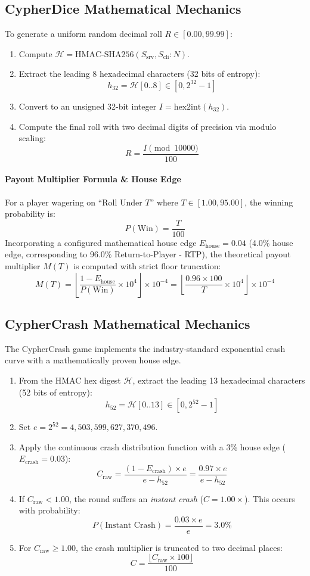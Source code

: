 \subsection{CypherDice Mathematical Mechanics}
To generate a uniform random decimal roll $R \in [0.00, 99.99]$:
\begin{enumerate}[leftmargin=1.5em]
    \item Compute $\mathcal{H} = \text{HMAC-SHA256}(S_{\text{srv}}, S_{\text{cli}} : N)$.
    \item Extract the leading 8 hexadecimal characters (32 bits of entropy):
    $$h_{32} = \mathcal{H}[0..8] \in [0, 2^{32} - 1]$$
    \item Convert to an unsigned 32-bit integer $I = \text{hex2int}(h_{32})$.
    \item Compute the final roll with two decimal digits of precision via modulo scaling:
    $$R = \frac{I \pmod{10000}}{100}$$
\end{enumerate}

\paragraph{Payout Multiplier Formula \& House Edge}
For a player wagering on ``Roll Under $T$'' where $T \in [1.00, 95.00]$, the winning probability is:
$$P(\text{Win}) = \frac{T}{100}$$
Incorporating a configured mathematical house edge $E_{\text{house}} = 0.04$ (4.0\% house edge, corresponding to 96.0\% Return-to-Player - RTP), the theoretical payout multiplier $M(T)$ is computed with strict floor truncation:
$$M(T) = \left\lfloor \frac{1 - E_{\text{house}}}{P(\text{Win})} \times 10^4 \right\rfloor \times 10^{-4} = \left\lfloor \frac{0.96 \times 100}{T} \times 10^4 \right\rfloor \times 10^{-4}$$

\subsection{CypherCrash Mathematical Mechanics}
The CypherCrash game implements the industry-standard exponential crash curve with a mathematically proven house edge.
\begin{enumerate}[leftmargin=1.5em]
    \item From the HMAC hex digest $\mathcal{H}$, extract the leading 13 hexadecimal characters (52 bits of entropy):
    $$h_{52} = \mathcal{H}[0..13] \in [0, 2^{52} - 1]$$
    \item Set $e = 2^{52} = 4,503,599,627,370,496$.
    \item Apply the continuous crash distribution function with a 3\% house edge ($E_{\text{crash}} = 0.03$):
    $$C_{\text{raw}} = \frac{(1 - E_{\text{crash}}) \times e}{e - h_{52}} = \frac{0.97 \times e}{e - h_{52}}$$
    \item If $C_{\text{raw}} < 1.00$, the round suffers an \textit{instant crash} ($C = 1.00\times$). This occurs with probability:
    $$P(\text{Instant Crash}) = \frac{0.03 \times e}{e} = 3.0\%$$
    \item For $C_{\text{raw}} \ge 1.00$, the crash multiplier is truncated to two decimal places:
    $$C = \frac{\lfloor C_{\text{raw}} \times 100 \rfloor}{100}$$
\end{enumerate}


